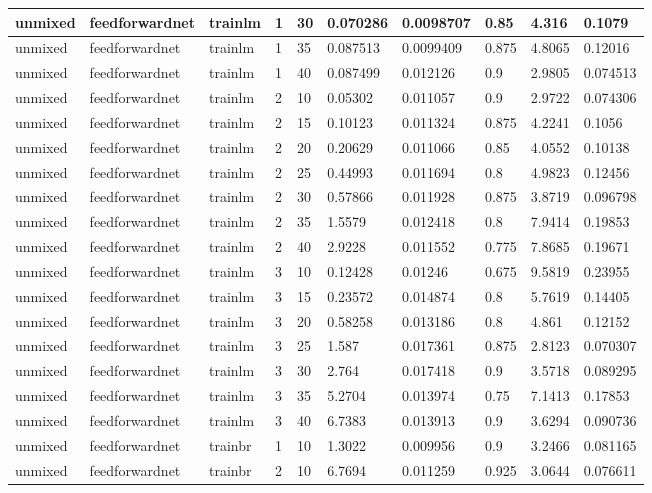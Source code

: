 \begin{longtable}{lllllllll}
unmixed & feedforwardnet & trainlm & 1 & 30 & 0.070286 & 0.0098707 & 0.85 & 4.316 & 0.1079 \\ \hline 
unmixed & feedforwardnet & trainlm & 1 & 35 & 0.087513 & 0.0099409 & 0.875 & 4.8065 & 0.12016 \\ \hline 
unmixed & feedforwardnet & trainlm & 1 & 40 & 0.087499 & 0.012126 & 0.9 & 2.9805 & 0.074513 \\ \hline 
unmixed & feedforwardnet & trainlm & 2 & 10 & 0.05302 & 0.011057 & 0.9 & 2.9722 & 0.074306 \\ \hline 
unmixed & feedforwardnet & trainlm & 2 & 15 & 0.10123 & 0.011324 & 0.875 & 4.2241 & 0.1056 \\ \hline 
unmixed & feedforwardnet & trainlm & 2 & 20 & 0.20629 & 0.011066 & 0.85 & 4.0552 & 0.10138 \\ \hline 
unmixed & feedforwardnet & trainlm & 2 & 25 & 0.44993 & 0.011694 & 0.8 & 4.9823 & 0.12456 \\ \hline 
unmixed & feedforwardnet & trainlm & 2 & 30 & 0.57866 & 0.011928 & 0.875 & 3.8719 & 0.096798 \\ \hline 
unmixed & feedforwardnet & trainlm & 2 & 35 & 1.5579 & 0.012418 & 0.8 & 7.9414 & 0.19853 \\ \hline 
unmixed & feedforwardnet & trainlm & 2 & 40 & 2.9228 & 0.011552 & 0.775 & 7.8685 & 0.19671 \\ \hline 
unmixed & feedforwardnet & trainlm & 3 & 10 & 0.12428 & 0.01246 & 0.675 & 9.5819 & 0.23955 \\ \hline 
unmixed & feedforwardnet & trainlm & 3 & 15 & 0.23572 & 0.014874 & 0.8 & 5.7619 & 0.14405 \\ \hline 
unmixed & feedforwardnet & trainlm & 3 & 20 & 0.58258 & 0.013186 & 0.8 & 4.861 & 0.12152 \\ \hline 
unmixed & feedforwardnet & trainlm & 3 & 25 & 1.587 & 0.017361 & 0.875 & 2.8123 & 0.070307 \\ \hline 
unmixed & feedforwardnet & trainlm & 3 & 30 & 2.764 & 0.017418 & 0.9 & 3.5718 & 0.089295 \\ \hline 
unmixed & feedforwardnet & trainlm & 3 & 35 & 5.2704 & 0.013974 & 0.75 & 7.1413 & 0.17853 \\ \hline 
unmixed & feedforwardnet & trainlm & 3 & 40 & 6.7383 & 0.013913 & 0.9 & 3.6294 & 0.090736 \\ \hline 
unmixed & feedforwardnet & trainbr & 1 & 10 & 1.3022 & 0.009956 & 0.9 & 3.2466 & 0.081165 \\ \hline 
unmixed & feedforwardnet & trainbr & 2 & 10 & 6.7694 & 0.011259 & 0.925 & 3.0644 & 0.076611 \\ \hline 

\end{longtable}
